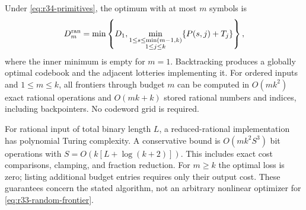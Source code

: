 \begin{theorem}\label{thm:r34-global}
Under \eqref{eq:r34-primitives}, the optimum with at most $m$ symbols is
\begin{equation}\label{eq:r34-frontier}
 D_m^{\rm ran}=\min\left\{D_1,
 \min_{\substack{1\leq s\leq\min(m-1,k)\\1\leq j\leq k}}
       \{P(s,j)+T_j\}\right\},
\end{equation}
where the inner minimum is empty for $m=1$. Backtracking produces a globally optimal codebook and the adjacent lotteries implementing it. For ordered inputs and $1\leq m\leq k$, all frontiers through budget $m$ can be computed in $O(mk^2)$ exact rational operations and $O(mk+k)$ stored rational numbers and indices, including backpointers. No codeword grid is required.

For rational input of total binary length $L$, a reduced-rational implementation has polynomial Turing complexity. A conservative bound is $O(mk^2 S^3)$ bit operations with $S=O(k[L+\log(k+2)])$. This includes exact cost comparisons, clamping, and fraction reduction. For $m\geq k$ the optimal loss is zero; listing additional budget entries requires only their output cost. These guarantees concern the stated algorithm, not an arbitrary nonlinear optimizer for \eqref{eq:r33-random-frontier}.
\end{theorem}

